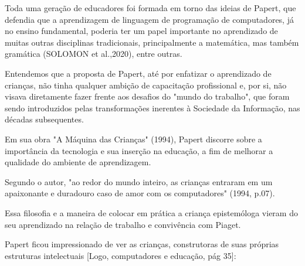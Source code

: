 Toda uma geração de educadores foi formada em torno das ideias de Papert, que defendia que a aprendizagem de linguagem de programação de computadores, já no ensino fundamental, poderia ter um papel importante no aprendizado de muitas outras disciplinas tradicionais, principalmente a matemática, mas também gramática (SOLOMON et al.,2020), entre outras.

Entendemos que a proposta de Papert, até por enfatizar o aprendizado de crianças, não tinha qualquer ambição de capacitação profissional e, por si, não visava diretamente fazer frente aos desafios do "mundo do trabalho", que foram sendo introduzidos pelas transformações inerentes à Sociedade da Informação, nas décadas subsequentes.

Em sua obra "A Máquina das Crianças" (1994), Papert discorre sobre a importância da tecnologia e sua inserção na educação, a fim de melhorar a qualidade do ambiente de aprendizagem.


\noindent\begin{center}\mbox{\centering{}}\end{center}


Segundo o autor, "ao redor do mundo inteiro, as crianças entraram em um apaixonante e duradouro caso de amor com os computadores" (1994, p.07).

Essa filosofia e a maneira de colocar em prática a criança epistemóloga vieram do seu aprendizado na relação de trabalho e convivência com Piaget.

Papert ficou impressionado de ver as crianças, construtoras de suas próprias estruturas intelectuais [Logo, computadores e educação, pág 35]:


\noindent\begin{center}\mbox{\centering{}}\end{center}


